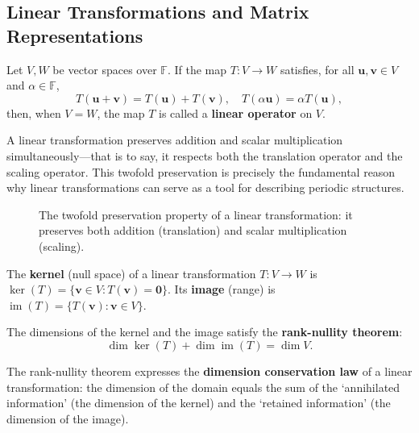 \subsection{\texorpdfstring{Linear Transformations and Matrix Representations}{Linear Transformations and Matrix Representations}}

\begin{definition}\label{def:linear_transformation}
Let $V, W$ be vector spaces over $\mathbb{F}$. If the map $T: V \to W$ satisfies, for all $\mathbf{u}, \mathbf{v} \in V$ and $\alpha \in \mathbb{F}$,
\[
T(\mathbf{u} + \mathbf{v}) = T(\mathbf{u}) + T(\mathbf{v}), \quad T(\alpha \mathbf{u}) = \alpha T(\mathbf{u}),
\]
then, when $V = W$, the map $T$ is called a \textbf{linear operator} on $V$.

A linear transformation preserves addition and scalar multiplication simultaneously---that is to say, it respects both the translation operator and the scaling operator. This twofold preservation is precisely the fundamental reason why linear transformations can serve as a tool for describing periodic structures.
\end{definition}

\begin{figure}[htbp]
\centering
{}
\caption{The twofold preservation property of a linear transformation: it preserves both addition (translation) and scalar multiplication (scaling).}
\label{fig:linear_transformation_property}
\end{figure}

\begin{definition}\label{def:kernel_image}
The \textbf{kernel} (null space) of a linear transformation $T: V \to W$ is $\ker(T) = \{\mathbf{v} \in V : T(\mathbf{v}) = \mathbf{0}\}$. Its \textbf{image} (range) is $\operatorname{im}(T) = \{T(\mathbf{v}) : \mathbf{v} \in V\}$.

The dimensions of the kernel and the image satisfy the \textbf{rank-nullity theorem}:
\[
\dim \ker(T) + \dim \operatorname{im}(T) = \dim V.
\]

The rank-nullity theorem expresses the \textbf{dimension conservation law} of a linear transformation: the dimension of the domain equals the sum of the `annihilated information' (the dimension of the kernel) and the `retained information' (the dimension of the image).
\end{definition}

